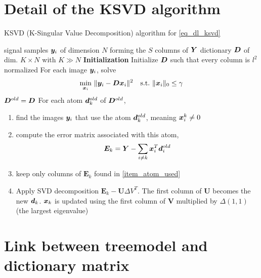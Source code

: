 \section{Detail of the \ac{KSVD} algorithm}\label{sec_ksvd_detail}
\begin{algorithm}
    \caption{\ac{KSVD} (K-Singular Value Decomposition) algorithm for \eqref{eq_dl_ksvd}}\label{alg_ksvd}
  \begin{algorithmic}[1]
    \Input signal samples $\bm{y}_i$ of dimension $N$ forming the $S$ columns of $\bm{Y}$
    \Output dictionary $\bm{D}$ of dim. $K \times N$ with $K \gg N$
    \State \textbf{Initialization} Initialize $\bm{D}$ such that every column is $l^2$ normalized
	\State For each image $\bm{y}_i$, solve \label{alg_ksvd_sparse_coding}
		\begin{align*}
			\quad \min_{\bm{x}_i}~ & \lVert \bm{y}_i-\bm{D}\bm{x}_i\rVert^2 \quad \text{s.t.}~ \lVert \bm{x}_i \rVert_0 \le \gamma
		\end{align*}
	\State $\bm{D}^{old} = \bm{D}$
	\State For each atom $\bm{d}_k^{old}$ of $\bm{D}^{old}$, \label{alg_ksvd_dict_update}
	\begin{enumerate}[leftmargin=15mm,label=(\alph*)]
		\item find the images $\bm{y}_i$ that use the atom $\bm{d}_k^{old}$, meaning $\bm{x}_i^k \ne 0$\label{item_atom_used}
		\item compute the error matrix associated with this atom,
		\begin{align*}
			\bm{E}_k = \bm{Y}-\sum_{i\ne k} \bm{x}_i^T\bm{d}_i^{old}
		\end{align*}
		\item keep only columns of $\bm{E}_k$ found in \cref{item_atom_used}
		\item Apply SVD decomposition $\bm{E}_k - \bm{U} \Delta V^T$. The first column of $\bm{U}$ becomes the new $\bm{d}_k$. $\bm{x}_k$ is updated using the first column of $\bm{V}$ multiplied by $\Delta(1,1)$ (the largest eigenvalue)
	\end{enumerate}
    \EndWhile
  \end{algorithmic}
\end{algorithm}



\FloatBarrier
\section{Link between \gls{treemodel} and dictionary matrix}\label{sec_matrix_vs_tree} 

